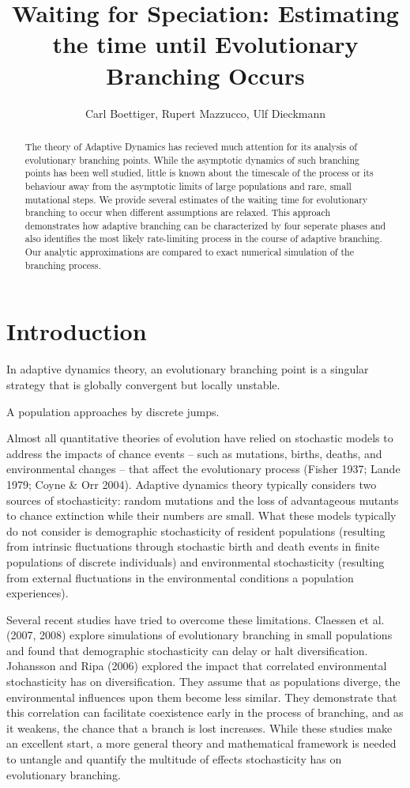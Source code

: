 \documentclass{article}
\title{Waiting for Speciation: Estimating the time until Evolutionary Branching Occurs}
\author{Carl Boettiger, Rupert Mazzucco, Ulf Dieckmann}
\begin{document}
\maketitle


\begin{abstract}
The theory of Adaptive Dynamics has recieved much attention for its analysis of evolutionary branching points.  While the asymptotic dynamics of such branching points has been well studied, little is known about the timescale of the process or its behaviour away from the asymptotic limits of large populations and rare, small mutational steps.  We provide several estimates of the waiting time for evolutionary branching to occur when different assumptions are relaxed.  This approach demonstrates how adaptive branching can be characterized by four seperate phases and also identifies the most likely rate-limiting process in the course of adaptive branching.  Our analytic approximations are compared to exact numerical simulation of the branching process.  
\end{abstract}


\section{Introduction}
In adaptive dynamics theory, an evolutionary branching point is a singular strategy that is globally convergent but locally unstable.  

A population approaches by discrete jumps.  

Almost all quantitative theories of evolution have relied on stochastic models to address the impacts of chance events – such as mutations, births, deaths, and environmental changes – that affect the evolutionary process (Fisher 1937; Lande 1979; Coyne \& Orr 2004). Adaptive dynamics theory typically considers two sources of stochasticity: random mutations and the loss of advantageous mutants to chance extinction while their numbers are small. What these models typically do not consider is demographic stochasticity of resident populations (resulting from intrinsic fluctuations through stochastic birth and death events in finite populations of discrete individuals) and environmental stochasticity (resulting from external fluctuations in the environmental conditions a population experiences).


Several recent studies have tried to overcome these limitations. Claessen et al. (2007, 2008) explore simulations of evolutionary branching in small populations and found that demographic stochasticity can delay or halt diversification. Johansson and Ripa (2006) explored the impact that correlated  environmental stochasticity has on diversification. They assume that as populations diverge, the environmental influences upon them become less similar. They demonstrate that this correlation can facilitate coexistence early in the process of branching, and as it weakens, the chance that a branch is lost increases. While these studies make an excellent start, a more general theory and mathematical framework is needed to untangle and quantify the multitude of effects stochasticity has on evolutionary branching.
\end{document}
